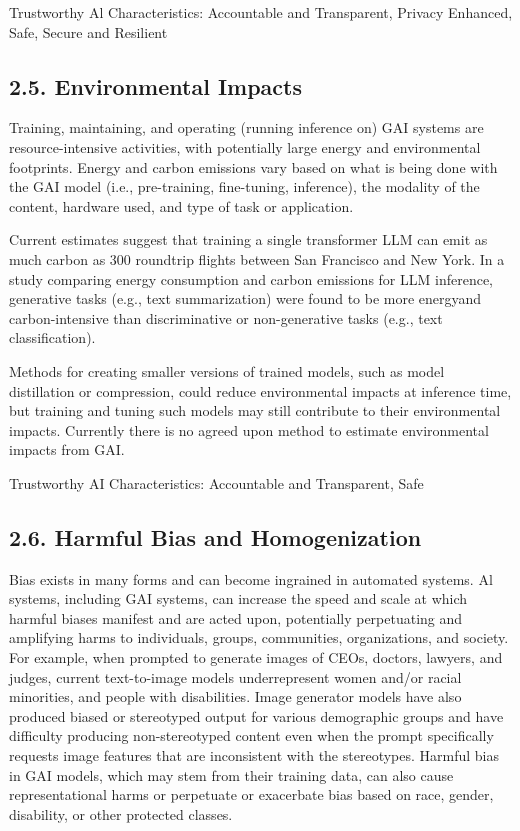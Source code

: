 \documentclass[10pt]{article}
\begin{document}
Trustworthy Al Characteristics: Accountable and Transparent, Privacy Enhanced, Safe, Secure and Resilient
\subsection*{2.5. Environmental Impacts}
Training, maintaining, and operating (running inference on) GAI systems are resource-intensive activities, with potentially large energy and environmental footprints. Energy and carbon emissions vary based on what is being done with the GAI model (i.e., pre-training, fine-tuning, inference), the modality of the content, hardware used, and type of task or application.

Current estimates suggest that training a single transformer LLM can emit as much carbon as 300 roundtrip flights between San Francisco and New York. In a study comparing energy consumption and carbon emissions for LLM inference, generative tasks (e.g., text summarization) were found to be more energyand carbon-intensive than discriminative or non-generative tasks (e.g., text classification).

Methods for creating smaller versions of trained models, such as model distillation or compression, could reduce environmental impacts at inference time, but training and tuning such models may still contribute to their environmental impacts. Currently there is no agreed upon method to estimate environmental impacts from GAI.

Trustworthy AI Characteristics: Accountable and Transparent, Safe
\subsection*{2.6. Harmful Bias and Homogenization}
Bias exists in many forms and can become ingrained in automated systems. Al systems, including GAI systems, can increase the speed and scale at which harmful biases manifest and are acted upon, potentially perpetuating and amplifying harms to individuals, groups, communities, organizations, and society. For example, when prompted to generate images of CEOs, doctors, lawyers, and judges, current text-to-image models underrepresent women and/or racial minorities, and people with disabilities. Image generator models have also produced biased or stereotyped output for various demographic groups and have difficulty producing non-stereotyped content even when the prompt specifically requests image features that are inconsistent with the stereotypes. Harmful bias in GAI models, which may stem from their training data, can also cause representational harms or perpetuate or exacerbate bias based on race, gender, disability, or other protected classes.
\end{document}
